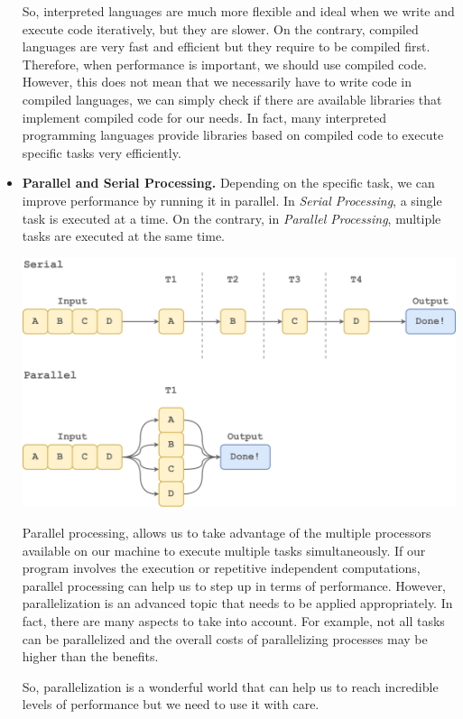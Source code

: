 \documentclass[
  11pt,
]{book}
\begin{document}
\begin{itemize}
  So, interpreted languages are much more flexible and ideal when we write and execute code iteratively, but they are slower. On the contrary, compiled languages are very fast and efficient but they require to be compiled first. Therefore, when performance is important, we should use compiled code. However, this does not mean that we necessarily have to write code in compiled languages, we can simply check if there are available libraries that implement compiled code for our needs. In fact, many interpreted programming languages provide libraries based on compiled code to execute specific tasks very efficiently.
\item
  \textbf{Parallel and Serial Processing.} Depending on the specific task, we can improve performance by running it in parallel. In \emph{Serial Processing}, a single task is executed at a time. On the contrary, in \emph{Parallel Processing}, multiple tasks are executed at the same time.

  \begin{center}\includegraphics[width=0.9\linewidth]{images/coding/coding} \end{center}

  Parallel processing, allows us to take advantage of the multiple processors available on our machine to execute multiple tasks simultaneously. If our program involves the execution or repetitive independent computations, parallel processing can help us to step up in terms of performance. However, parallelization is an advanced topic that needs to be applied appropriately. In fact, there are many aspects to take into account. For example, not all tasks can be parallelized and the overall costs of parallelizing processes may be higher than the benefits.

  So, parallelization is a wonderful world that can help us to reach incredible levels of performance but we need to use it with care.
\end{itemize}
\end{document}
